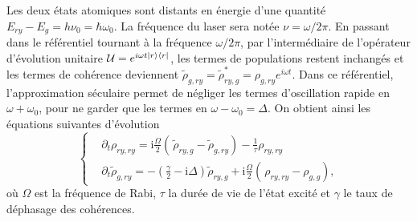 Les deux états atomiques sont distants en énergie d'une quantité $E_{ry}-E_{g} = h\nu_{0} = \hbar\omega_0$.
La fréquence du laser sera notée $\nu =\omega/ 2\pi$.
En passant dans le référentiel tournant à la fréquence $\omega/2\pi$, par l'intermédiaire de l'opérateur d'évolution unitaire $\mathcal{U} = e^{i\omega t \ket{r}\bra{r}}$, les termes de populations restent inchangés et les termes de cohérence deviennent $\tilde{\rho}_{g,ry} = \tilde{\rho}_{ry,g}^* =  \rho_{g,ry}e^{i\omega t}$.
Dans ce référentiel, l'approximation séculaire permet de négliger les termes d'oscillation rapide en $\omega+\omega_0$, pour ne garder que les termes en $\omega-\omega_0 =\Delta$.
On obtient ainsi les équations suivantes d'évolution
\begin{equation}
\label{eq:Bloch_eq}
\left\{
\begin{aligned}
&\partial_t\rho_{ry,ry} = \mathrm{i} \frac{\Omega}{2} \left( \frac{}{}\! \tilde{\rho}_{ry,g} - \tilde{\rho}_{g,ry} \right) - \frac{1}{\tau}\rho_{ry,ry} \\
&\partial_t\tilde{\rho}_{g,ry} =-\left( \frac{\gamma}{2} - \mathrm{i} \Delta \right) \tilde{\rho}_{ry,g} + \mathrm{i} \frac{\Omega}{2} \left(\frac{}{}\! \rho_{ry,ry} - \rho_{g,g} \right),
\end{aligned}
\right.
\end{equation}
où $\Omega$ est la fréquence de Rabi, $\tau$ la durée de vie de l'état excité et $\gamma$ le taux de déphasage des cohérences.

